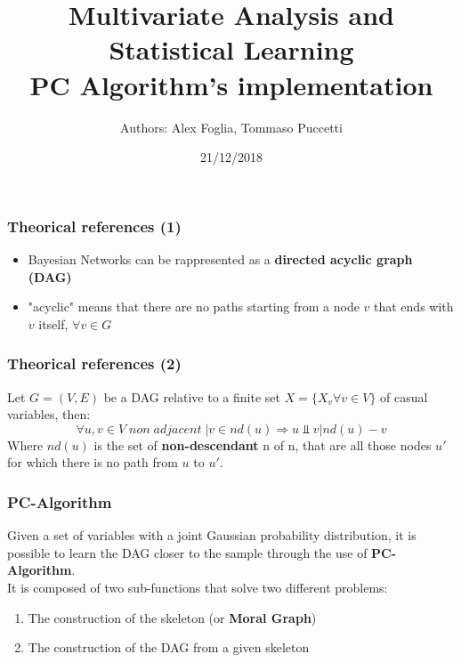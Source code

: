 \documentclass[xcolor ={table,usenames,dvipsnames}]{beamer}
\title{Multivariate Analysis and Statistical Learning \\PC Algorithm's implementation}
\author{Authors: Alex Foglia, Tommaso Puccetti}
\institute{Universit\`a  degli Studi di Firenze}
\date{21/12/2018}
\theoremstyle{definition}
\begin{document}
	
	\begin{frame}
		\maketitle
	\end{frame}

	\begin{frame}
		\frametitle{Theorical references (1)}
		\begin{itemize}
			\item Bayesian Networks can be rappresented as a \textbf{directed acyclic graph (DAG)}
			\item "acyclic" means that there are no paths starting from a node $v$ that ends with $v$ itself, $\forall v \in G$
			
		\end{itemize}
	\end{frame}

	\begin{frame}
		\frametitle{Theorical references (2)}
		Let $G = (V,E)$ be a DAG relative to a finite set  $X = \{X_v \forall v \in V\}$ of casual variables, then:
		$$
		\forall u,v \in V \;non\;adjacent\;| v \in nd(u) \Rightarrow u \Perp v | nd(u) - v
		$$
	Where $nd(u)$ is the set of \textbf{non-descendant} n of n, that are all those nodes $u'$ for which there is no path from $u$ to $u'$. \\
	\end{frame}

	\begin{frame}
		\frametitle{PC-Algorithm}
		Given a set of variables with a joint Gaussian probability distribution, it is possible to learn the DAG closer to the sample through the use of  \textbf{PC-Algorithm}. \\
		It is composed of two sub-functions that solve two different problems:
		\begin{enumerate}
			\item The construction of the skeleton (or \textbf{Moral Graph})
			\item The construction of the DAG from a given skeleton
		\end{enumerate}
	\end{frame}
\end{document}
